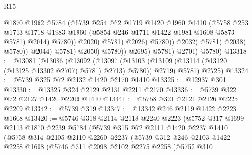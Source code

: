 \begin{lexlean}{R15}
\begin{coremodule}
                                            @1870
                                            @1962
                                            @5784
                                            (@5739
                                              @254
                                              @72
                                              @1719
                                              @1420
                                              @1960
                                              @1410
                                              (@5758
                                                @253
                                                @1713
                                                @1718
                                                @1983
                                                @1960
                                                (@5854 @246 @1711 @1422 @1981 @1608 @5873 @5781)
                                                @2014)
                                              @5780))
                                          @2020)
                                        @5781)
                                      @2026)
                                    @5780))
                                @2032)
                              @5781)
                            @2038)
                          @5780))
                      @2044)
                    @5781)
                  @2050)
                @5780))
            @2695)
          @5781)
        @2701)
      @5780)
@13318 := @13081
    (@13086
      (@13092
        (@13097 (@13103 (@13109 (@13114 (@13120 (@13125 @13302 @2707) @5781) @2713) @5780)) @2719)
        @5781)
      @2725)
@13324 := @5739 @325 @72 @2132 @1420 @2170 @1410
@13325 := @12937 @301
@13330 := @13325 @324 @2129 @2131 @2211 @2170
@13336 := @5739 @322 @72 @2127 @1420 @2209 @1410
@13341 := @5758 @321 @2121 @2126 @2225 @2209
@13342 := @5739 @319
@13347 := @13342 @246 @2119 @1422 @2223 @1608
@13420 := @5746
    @318
    @2114
    @2118
    @2240
    @2223
    (@5752
      @317
      @1699
      @2113
      @1870
      @2239
      @5784
      (@5739
        @315
        @72
        @2111
        @1420
        @2237
        @1410
        (@5758
          @314
          @2105
          @2110
          @2260
          @2237
          (@5739
            @312
            @246
            @2103
            @1422
            @2258
            @1608
            (@5746
              @311
              @2098
              @2102
              @2275
              @2258
              (@5752
                @310

\end{coremodule}
\end{lexlean}
